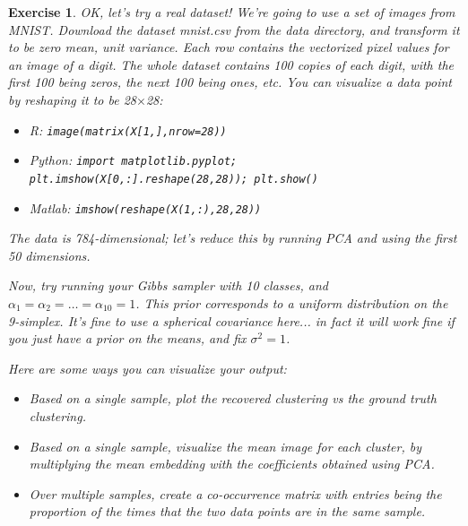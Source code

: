 \documentclass[twoside]{article}
\newcounter{lecnum}
\newtheorem{exercise}{Exercise}[lecnum]
\begin{document}
 \begin{exercise}
   OK, let's try a real dataset! We're going to use a set of images from MNIST. Download the dataset mnist.csv from the data directory, and transform it to be zero mean, unit variance. Each row contains the vectorized pixel values for an image of a digit. The whole dataset contains 100 copies of each digit, with the first 100 being zeros, the next 100 being ones, etc. You can visualize a data point by reshaping it to be 28$\times$28:

   \begin{itemize}
   \item R: \texttt{image(matrix(X[1,],nrow=28))}
   \item Python: \texttt{import matplotlib.pyplot; plt.imshow(X[0,:].reshape(28,28)); plt.show()}
   \item Matlab: \texttt{imshow(reshape(X(1,:),28,28))}
   \end{itemize}

  
   
   The data is 784-dimensional; let's reduce this by running PCA and using the first 50 dimensions.


   Now, try running your Gibbs sampler with 10 classes, and $\alpha_1 =\alpha_2=\dots=\alpha_{10} = 1$. This prior corresponds to a uniform distribution on the 9-simplex. It's fine to use a spherical covariance here... in fact it will work fine if you just have a prior on the means, and fix $\sigma^2=1$.

   Here are some ways you can visualize your output:
   \begin{itemize}
   \item Based on a single sample, plot the recovered clustering vs the ground truth clustering.
   \item Based on a single sample, visualize the mean image for each cluster, by multiplying the mean embedding with the coefficients obtained using PCA.
   \item Over multiple samples, create a co-occurrence matrix with entries being the proportion of the times that the two data points are in the same sample.
   \end{itemize}
 \end{exercise}
\end{document}
